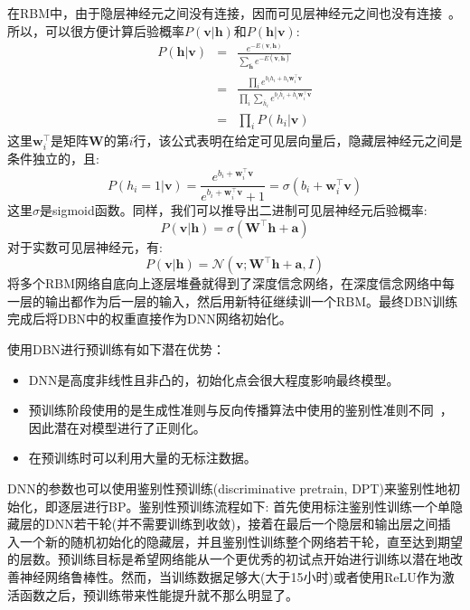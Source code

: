在RBM中，由于隐层神经元之间没有连接，因而可见层神经元之间也没有连接~\cite{yu2010roles}。所以，可以很方便计算后验概率$P(\mathbf{v}|\mathbf{h})$和$P(\mathbf{h}|\mathbf{v})$:
\begin{eqnarray}
    P(\mathbf{h}|\mathbf{v}) &=& \frac{e^{-E(\mathbf{v}, \mathbf{h})}}{\sum_{\bar{\mathbf{h}}}e^{-E(\mathbf{v}, \bar{\mathbf{h}})}} \\
    &=& \frac{\prod_i e^{b_ih_i+h_i\mathbf{w}^{\top}_i \mathbf{v}}}{\prod_i \sum_{\bar{h}_i} e^{b_i\bar{h}_i+\bar{h}_i\mathbf{w}^{\top}_i \mathbf{v}}} \\
    &=& \prod_i P(h_i|\mathbf{v})
\end{eqnarray}
这里$\mathbf{w}^{\top}_i$是矩阵$\mathbf{W}$的第$i$行，该公式表明在给定可见层向量后，隐藏层神经元之间是条件独立的，且:
\begin{equation}
    P(h_i=1 | \mathbf{v}) = \frac{e^{b_i+\mathbf{w}^{\top}_i \mathbf{v}}}{e^{b_i+\mathbf{w}^{\top}_i \mathbf{v}} + 1} = \sigma(b_i + \mathbf{w}^{\top}_i \mathbf{v})
\end{equation}
这里$\sigma$是sigmoid函数。同样，我们可以推导出二进制可见层神经元后验概率:
\begin{equation}
    P(\mathbf{v}|\mathbf{h})=\sigma(\mathbf{W}^{\top}\mathbf{h}+\mathbf{a})
\end{equation}
对于实数可见层神经元，有:
\begin{equation}
    P(\mathbf{v}|\mathbf{h}) = \mathcal{N}(\mathbf{v}; \mathbf{W}^{\top}\mathbf{h}+\mathbf{a}, I)
\end{equation}
将多个RBM网络自底向上逐层堆叠就得到了深度信念网络，在深度信念网络中每一层的输出都作为后一层的输入，然后用新特征继续训一个RBM。最终DBN训练完成后将DBN中的权重直接作为DNN网络初始化。

使用DBN进行预训练有如下潜在优势：
\begin{itemize}
    \item DNN是高度非线性且非凸的，初始化点会很大程度影响最终模型。
    \item 预训练阶段使用的是生成性准则与反向传播算法中使用的鉴别性准则不同~\cite{yu2010roles}，因此潜在对模型进行了正则化。
    \item 在预训练时可以利用大量的无标注数据。
\end{itemize}

DNN的参数也可以使用鉴别性预训练(discriminative pretrain, DPT)来鉴别性地初始化，即逐层进行BP。鉴别性预训练流程如下: 首先使用标注鉴别性训练一个单隐藏层的DNN若干轮(并不需要训练到收敛)，接着在最后一个隐层和输出层之间插入一个新的随机初始化的隐藏层，并且鉴别性训练整个网络若干轮，直至达到期望的层数。预训练目标是希望网络能从一个更优秀的初试点开始进行训练以潜在地改善神经网络鲁棒性。然而，当训练数据足够大(大于15小时)或者使用ReLU作为激活函数之后，预训练带来性能提升就不那么明显了。

